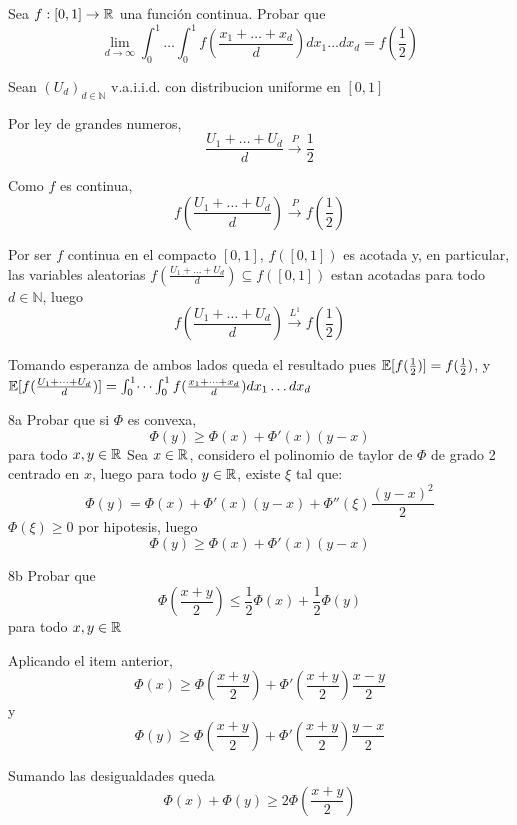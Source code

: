 \documentclass[11pt,a4paper]{article}
\begin{document}
\begin{ejercicio}{5}{
	Sea $f:[0,1] \to \mathbb R$ una funci\'on continua. Probar que
	$$
		\lim_{d\to\infty}
		\int_0^1 \dots \int_0^1
		f\left(
		\frac{
			x_1 + \dots + x_d
		}{d}
		\right)
		dx_1 \dots dx_d
		=
		f\left(\frac{1}{2}\right)
	$$
}{
	Sean $(U_d)_{d \in \mathbb N}$ v.a.i.i.d. con distribucion uniforme en $[0,1]$

	Por ley de grandes numeros,
	$$
		\frac {U_1 + \dots + U_d}{d} \overset{P}{\to} \frac{1}{2}
	$$

	Como $f$ es continua,
	$$
		f\left(\frac {U_1 + \dots + U_d}{d}\right) \overset{P}{\to} f\left(\frac{1}{2}\right)
	$$

	Por ser $f$ continua en el compacto $[0,1]$, $f([0,1])$ es acotada y, en particular, las variables aleatorias $f(\frac {U_1 + \dots + U_d}{d}) \subseteq f([0,1])$ estan acotadas para todo $d \in \mathbb N$, luego
	$$
		f\left(\frac {U_1 + \dots + U_d}{d}\right) \overset{L^1}{\to} f\left(\frac{1}{2}\right)
	$$


	Tomando esperanza de ambos lados queda el resultado pues $\mathbb E[f(\frac{1}{2})] = f(\frac{1}{2})$, y
	$\mathbb E[f(\frac {U_1 + \dots + U_d}{d})]
	=
	\int_0^1 \dots \int_0^1
	f(
	\frac{
		x_1 + \dots + x_d
	}{d}
	)
	dx_1 \dots dx_d$

}
\end{ejercicio}


\begin{ejercicio}{8a}{
	Probar que si $\Phi$ es convexa,
	$$
		\Phi(y) \ge \Phi(x) + \Phi'(x)(y-x)
	$$
	para todo $ x,y \in \mathbb R $
}{
	Sea $x \in \mathbb R$, considero el polinomio de taylor de $\Phi$ de grado 2 centrado en $x$, luego para todo $y \in \mathbb R$, existe $\xi$ tal que:
	$$
		\Phi(y) = \Phi(x) + \Phi'(x) (y-x) + \Phi''(\xi) \frac{(y-x)^2}{2}
	$$
	$\Phi(\xi) \ge 0$ por hipotesis, luego
	$$
		\Phi(y) \ge \Phi(x) + \Phi'(x) (y-x)
	$$
}
\end{ejercicio}

\begin{ejercicio}{8b}{
	Probar que 
	$$
		\Phi(\frac{x+y}{2}) \le \frac{1}{2}\Phi(x) + \frac{1}{2}\Phi(y)
	$$
	para todo $ x,y \in \mathbb R $
}{
	Aplicando el item anterior,
	$$
		\Phi(x) \ge \Phi(\frac{x+y}{2}) + \Phi'(\frac{x+y}{2}) \frac{x-y}{2}
	$$
	y
	$$
		\Phi(y) \ge \Phi(\frac{x+y}{2}) + \Phi'(\frac{x+y}{2}) \frac{y-x}{2}
	$$

	Sumando las desigualdades queda
	$$
		\Phi(x) + \Phi(y) \ge 2 \Phi\left(\frac{x+y}{2}\right)
	$$
}
\end{ejercicio}
\end{document}

